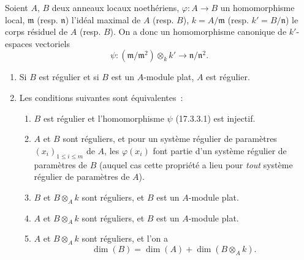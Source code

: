 \begin{proposition}[17.3.3]
\label{0.17.3.3-fr}
Soient $A$, $B$ deux anneaux locaux noethériens,
$\varphi:A\longrightarrow B$ un homomorphisme local, $\mathfrak{m}$ (resp.
$\mathfrak{n}$) l'idéal maximal de $A$ (resp. $B$),
$k=A/\mathfrak{m}$ (resp. $k'=B/\mathfrak{n}$) le corps résiduel de $A$
(resp. $B$). On a donc un homomorphisme canonique de $k'$-espaces vectoriels
\begin{equation}
\label{0.17.3.3.1-fr}
\tag{17.3.3.1}
  \psi:(\mathfrak{m}/\mathfrak{m}^2)\otimes_k k'
  \longrightarrow\mathfrak{n}/\mathfrak{n}^2.
\end{equation}
\begin{enumerate}
  \item[\rm (i)] Si $B$ est régulier et si $B$ est un $A$-module plat, $A$
  est régulier.
  \item[\rm (ii)] Les conditions suivantes sont équivalentes~:
  \begin{enumerate}
    \item[\rm a)] $B$ est régulier et l'homomorphisme $\psi$ (17.3.3.1) est
    injectif.
    \item[\rm b)] $A$ et $B$ sont réguliers, et pour un système régulier de
    paramètres $(x_i)_{1\leq i\leq m}$ de $A$, les $\varphi(x_i)$ font partie
    d'un système régulier de paramètres de $B$ (auquel cas cette propriété a
    lieu pour \emph{tout} système régulier de paramètres de $A$).
    \item[\rm c)] $B$ et $B\otimes_A k$ sont réguliers, et $B$ est un
    $A$-module plat.
    \item[\rm d)] $A$ et $B\otimes_A k$ sont réguliers, et $B$ est un
    $A$-module plat.
    \item[\rm e)] $A$ et $B\otimes_A k$ sont réguliers, et l'on a
    \begin{equation}
    \label{0.17.3.3.2-fr}
    \tag{17.3.3.2}
      \dim(B)=\dim(A)+\dim(B\otimes_A k).
    \end{equation}
  \end{enumerate}
\end{enumerate}
\end{proposition}

